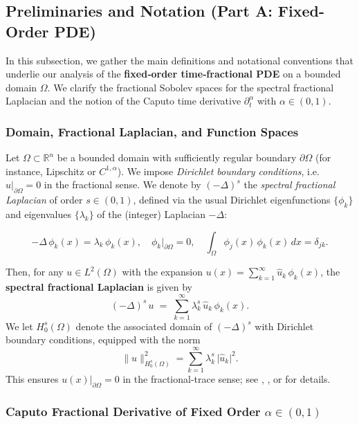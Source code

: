 \documentclass[12pt]{article}
\begin{document}
\subsection{Preliminaries and Notation (Part A: Fixed-Order PDE)}
\label{subsec:prelim_partA}

In this subsection, we gather the main definitions and notational conventions 
that underlie our analysis of the \textbf{fixed‐order time‐fractional PDE} on 
a bounded domain $\Omega$. We clarify the fractional Sobolev spaces for the 
spectral fractional Laplacian and the notion of the Caputo time derivative 
$\partial_t^\alpha$ with $\alpha \in (0,1)$.

\subsubsection{Domain, Fractional Laplacian, and Function Spaces}
\label{subsubsec:domain_spaces}

Let $\Omega\subset \mathbb{R}^n$ be a bounded domain with sufficiently regular 
boundary $\partial\Omega$ (for instance, Lipschitz or $C^{1,\alpha}$). We impose 
\emph{Dirichlet boundary conditions}, i.e.\ $u|_{\partial\Omega} = 0$ in the 
fractional sense. We denote by $(-\Delta)^s$ the \emph{spectral fractional 
Laplacian} of order $s\in(0,1)$, defined via the usual Dirichlet eigenfunctions 
$\{\phi_k\}$ and eigenvalues $\{\lambda_k\}$ of the (integer) Laplacian $-\Delta$:

\[
-\Delta \,\phi_k(x) 
= 
\lambda_k\,\phi_k(x),
\quad
\phi_k\big|_{\partial\Omega}=0,
\quad
\int_\Omega \phi_j(x)\,\phi_k(x)\,dx
=
\delta_{jk}.
\]

Then, for any $u\in L^2(\Omega)$ with the expansion 
$u(x) = \sum_{k=1}^{\infty} \hat{u}_k\,\phi_k(x)$, 
the \textbf{spectral fractional Laplacian} is given by
\[
(-\Delta)^s \,u
\;=\;
\sum_{k=1}^\infty
 \lambda_k^s\,\hat{u}_k\,\phi_k(x).
\]
We let $H_0^s(\Omega)$ denote the associated domain of $(-\Delta)^s$ with Dirichlet 
boundary conditions, equipped with the norm 
\[
\|u\|_{H_0^s(\Omega)}^2 
=\sum_{k=1}^{\infty} \lambda_k^s \,\lvert \hat{u}_k\rvert^2.
\]
This ensures $u(x)\big|_{\partial\Omega}=0$ in the fractional-trace sense; see 
\cite[Ch.~1]{Kilbas2006}, \cite[Sec.~3.1]{Diethelm2010}, or 
\cite{DiNezzaPalatucciValdinoci} for details.

\subsubsection{Caputo Fractional Derivative of Fixed Order \texorpdfstring{\(\alpha\in(0,1)\)}{}}
\label{subsubsec:caputo_fixed}
\end{document}
